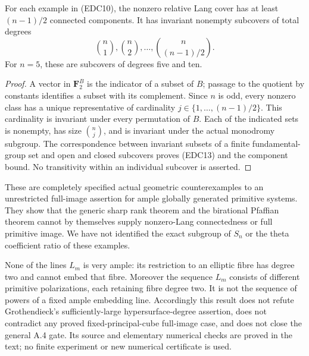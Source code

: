 \begin{corollary}
\label{cor:root-primitive-permutation-Lang-components}
For each example in (EDC10), the nonzero relative Lang cover
has at least \((n-1)/2\) connected components. It has invariant
nonempty subcovers of total degrees
\[
                       \binom n1,\binom n2,\ldots,
                              \binom n{(n-1)/2}.     \tag{EDC13}
\]
For \(n=5\), these are subcovers of degrees five and ten.
\end{corollary}
\begin{proof}
A vector in \(\mathbf F_2^B\) is the indicator of a subset
of \(B\); passage to the quotient by constants identifies a
subset with its complement. Since \(n\) is odd, every nonzero
class has a unique representative of cardinality
\(j\in\{1,\ldots,(n-1)/2\}\). This cardinality is invariant
under every permutation of \(B\). Each of the indicated sets
is nonempty, has size \(\binom nj\), and is invariant under
the actual monodromy subgroup. The correspondence between
invariant subsets of a finite fundamental-group set and open
and closed subcovers proves (EDC13) and the component bound.
No transitivity within an individual subcover is asserted.
\end{proof}

\begin{remark}
\label{rem:root-primitive-permutation-scope}
These are completely specified actual geometric counterexamples
to an unrestricted full-image assertion for ample globally
generated primitive systems. They show that the generic sharp
rank theorem and the birational Pfaffian theorem cannot by
themselves supply nonzero-Lang connectedness or full primitive
image. We have not identified the exact subgroup of \(S_n\)
or the theta coefficient ratio of these examples.

None of the lines \(L_m\) is very ample: its restriction to an
elliptic fibre has degree two and cannot embed that fibre.
Moreover the sequence \(L_m\) consists of different primitive
polarizations, each retaining fibre degree two. It is not the
sequence of powers of a fixed ample embedding line. Accordingly
this result does not refute Grothendieck's sufficiently-large
hypersurface-degree assertion, does not contradict any proved
fixed-principal-cube full-image case, and does not close the
general A.4 gate. Its source and elementary numerical checks are
proved in the text; no finite experiment or new numerical
certificate is used.
\end{remark}
